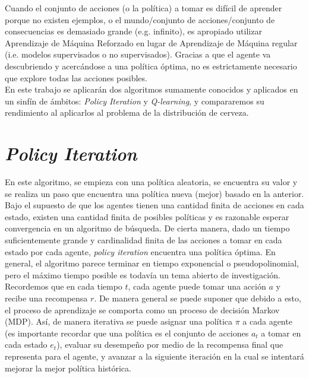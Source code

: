 Cuando el conjunto de acciones (o la pol\'itica) a tomar es dif\'icil de aprender porque no existen ejemplos, o el mundo/conjunto de acciones/conjunto de consecuencias es demasiado grande (e.g. infinito), es apropiado utilizar Aprendizaje de M\'aquina Reforzado en lugar de Aprendizaje de M\'aquina regular (i.e. modelos supervisados o no supervisados). Gracias a que el agente va descubriendo y acerc\'andose a una pol\'itica \'optima, no es estrictamente necesario que explore todas las acciones posibles. \\

En este trabajo se aplicar\'an dos algoritmos sumamente conocidos y aplicados en un sinf\'in de \'ambitos: \textit{Policy Iteration} y \textit{Q-learning}, y compararemos su rendimiento al aplicarlos al problema de la distribuci\'on de cerveza.

\section{\textit{Policy Iteration}}

En este algoritmo, se empieza con una pol\'itica aleatoria, se encuentra su valor y se realiza un paso que encuentra una pol\'itica nueva (mejor) basado en la anterior. Bajo el supuesto de que los agentes tienen una cantidad finita de acciones en cada estado, existen una cantidad finita de posibles pol\'iticas y es razonable esperar convergencia en un algoritmo de b\'usqueda. De cierta manera, dado un tiempo suficientemente grande y cardinalidad finita de las acciones a tomar en cada estado por cada agente, \textit{policy iteration} encuentra una pol\'itica \'optima. En general, el algoritmo parece terminar en tiempo exponencial o pseudopolinomial, pero el m\'aximo tiempo posible es todav\'ia un tema abierto de investigaci\'on.\\

Recordemos que en cada tiempo $t$, cada agente puede tomar una acci\'on $a$ y recibe una recompensa $r$. De manera general se puede suponer que debido a esto, el proceso de aprendizaje se comporta como un proceso de decisi\'on Markov (MDP). As\'i, de manera iterativa se puede asignar una pol\'itica $\pi$ a cada agente (es importante recordar que una pol\'itica es el conjunto de acciones $a_t$ a tomar en cada estado $e_t$), evaluar su desempe\~no por medio de la recompensa final que representa para el agente, y avanzar a la siguiente iteraci\'on en la cual se intentar\'a mejorar la mejor pol\'itica hist\'orica.\\

